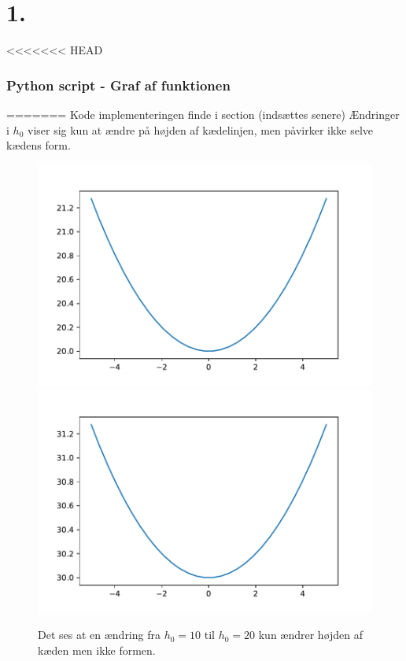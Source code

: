 \section*{1.}
<<<<<<< HEAD
% 
\subsubsection*{Python script - Graf af funktionen}
%

%
=======
Kode implementeringen finde i section (indsættes senere)
% 
Ændringer i $h_0$ viser sig kun at ændre på højden af kædelinjen, men påvirker ikke selve kædens form.

\begin{figure}[h!]
\includegraphics[scale=0.5]{code/fig1}
\includegraphics[scale=0.5]{code/fig2}
\caption{Det ses at en ændring fra $h_0=10$ til $h_0=20$ kun ændrer højden af kæden men ikke formen.}
\end{figure}



